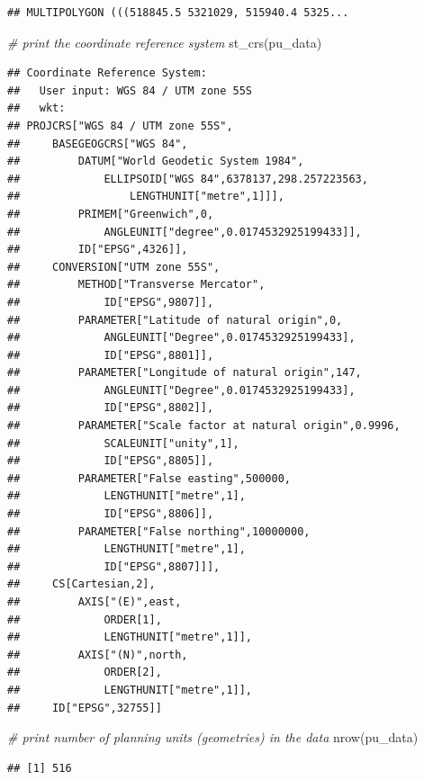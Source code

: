 \documentclass[
  12pt,
]{book}
\newenvironment{Shaded}{\begin{snugshade}}{\end{snugshade}}
\newcommand{\CommentTok}[1]{\textcolor[rgb]{0.56,0.35,0.01}{\textit{#1}}}
\newcommand{\FunctionTok}[1]{\textcolor[rgb]{0.00,0.00,0.00}{#1}}
\newcommand{\NormalTok}[1]{#1}
\begin{document}
\begin{verbatim}
## MULTIPOLYGON (((518845.5 5321029, 515940.4 5325...
\end{verbatim}

\begin{Shaded}
\begin{Highlighting}[]
\CommentTok{\# print the coordinate reference system}
\FunctionTok{st\_crs}\NormalTok{(pu\_data)}
\end{Highlighting}
\end{Shaded}

\begin{verbatim}
## Coordinate Reference System:
##   User input: WGS 84 / UTM zone 55S 
##   wkt:
## PROJCRS["WGS 84 / UTM zone 55S",
##     BASEGEOGCRS["WGS 84",
##         DATUM["World Geodetic System 1984",
##             ELLIPSOID["WGS 84",6378137,298.257223563,
##                 LENGTHUNIT["metre",1]]],
##         PRIMEM["Greenwich",0,
##             ANGLEUNIT["degree",0.0174532925199433]],
##         ID["EPSG",4326]],
##     CONVERSION["UTM zone 55S",
##         METHOD["Transverse Mercator",
##             ID["EPSG",9807]],
##         PARAMETER["Latitude of natural origin",0,
##             ANGLEUNIT["Degree",0.0174532925199433],
##             ID["EPSG",8801]],
##         PARAMETER["Longitude of natural origin",147,
##             ANGLEUNIT["Degree",0.0174532925199433],
##             ID["EPSG",8802]],
##         PARAMETER["Scale factor at natural origin",0.9996,
##             SCALEUNIT["unity",1],
##             ID["EPSG",8805]],
##         PARAMETER["False easting",500000,
##             LENGTHUNIT["metre",1],
##             ID["EPSG",8806]],
##         PARAMETER["False northing",10000000,
##             LENGTHUNIT["metre",1],
##             ID["EPSG",8807]]],
##     CS[Cartesian,2],
##         AXIS["(E)",east,
##             ORDER[1],
##             LENGTHUNIT["metre",1]],
##         AXIS["(N)",north,
##             ORDER[2],
##             LENGTHUNIT["metre",1]],
##     ID["EPSG",32755]]
\end{verbatim}

\begin{Shaded}
\begin{Highlighting}[]
\CommentTok{\# print number of planning units (geometries) in the data}
\FunctionTok{nrow}\NormalTok{(pu\_data)}
\end{Highlighting}
\end{Shaded}

\begin{verbatim}
## [1] 516
\end{verbatim}
\end{document}
